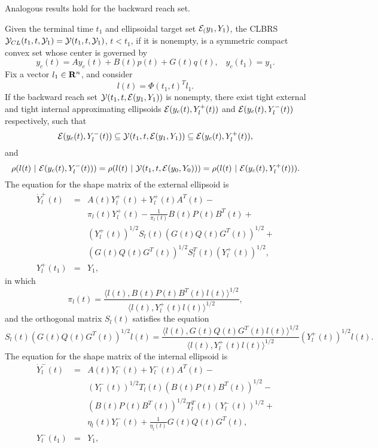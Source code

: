 



Analogous results hold for the backward reach set.

Given the terminal time $t_1$ and ellipsoidal target set $\EE_(y_1,Y_1)$, the
CLBRS $\YY_{CL}(t_1, t, \YY_1)=\YY(t_1, t, \YY_1)$, $t<t_1$, if it is nonempty,
is a symmetric compact convex set whose center is governed by
\begin{equation}
y_c(t) = Ay_c(t) + B(t)p(t) + G(t)q(t), \;\;\; y_c(t_1) = y_1.\label{bckcenter}
\end{equation}
Fix a vector $l_1\in{\bf R}^n$, and consider
\begin{equation}
l(t) = \Phi(t_1, t)^Tl_1 .
\label{bckadjoint}
\end{equation}
If the backward reach set $\YY(t_1, t, \EE(y_1,Y_1))$ is nonempty,
there exist tight external and
tight internal approximating ellipsoids $\EE(y_c(t), Y^+_l(t))$ and
$\EE(y_c(t), Y^-_l(t))$ respectively, such that
\begin{equation}
\EE(y_c(t), Y^-_l(t))\subseteq\YY(t_1,t,\EE(y_1,Y_1))
\subseteq \EE(y_c(t), Y^+_l(t)),
\label{bckinclusion}
\end{equation}
and
\begin{equation}
\rho(l(t) ~|~ \EE(y_c(t), Y^-_l(t))) =
\rho(l(t) ~|~ \YY(t_1, t, \EE(y_0,Y_0))) =
\rho(l(t) ~|~ \EE(y_c(t), Y^+_l(t))) .
\label{bcktightness}
\end{equation}
The equation for the shape matrix of the external ellipsoid is
\begin{eqnarray}
\dot{Y}^+_l(t) & = & A(t)Y^+_l(t) + Y^+_l(t)A^T(t) -\nonumber \\
& & \pi_l(t)Y^+_l(t) - \frac{1}{\pi_l(t)}B(t)P(t)B^T(t) +\nonumber \\
& & (Y_l^{+}(t))^{1/2}S_l(t)(G(t)Q(t)G^T(t))^{1/2} +\nonumber \\
& & (G(t)Q(t)G^T(t))^{1/2}S_l^T(t)(Y_l^{+}(t))^{1/2}, \label{bckext1} \\
Y^+_l(t_1) & = & Y_1, \label{bckext2}
\end{eqnarray}
in which
\[ \pi_l(t) = \frac{\langle l(t),
B(t)P(t)B^T(t)l(t)\rangle^{1/2}}{\langle l(t),
Y^+_l(t)l(t)\rangle^{1/2}}, \]
and the orthogonal matrix $S_l(t)$ satisfies the equation
\[ S_l(t)(G(t)Q(t)G^T(t))^{1/2}l(t) = \frac{\langle l(t),
G(t)Q(t)G^T(t)l(t)\rangle^{1/2}}{\langle l(t),
Y_l^+(t)l(t)\rangle^{1/2}}(Y_l^{+}(t))^{1/2}l(t). \]
The equation for the shape matrix of the internal ellipsoid is
\begin{eqnarray}
\dot{Y}^-_l(t) & = & A(t)Y^-_l(t) + Y^-_l(t)A^T(t) -\nonumber \\
& & (Y_l^{-}(t))^{1/2}T_l(t)(B(t)P(t)B^T(t))^{1/2} -\nonumber \\
& & (B(t)P(t)B^T(t))^{1/2}T_l^T(t)(Y_l^{-}(t))^{1/2} +\nonumber \\
& & \eta_l(t)Y^-_l(t) + \frac{1}{\eta_l(t)}G(t)Q(t)G^T(t), \label{bckint1} \\
Y^-_l(t_1) & = & Y_1, \label{bckint2}
\end{eqnarray}
